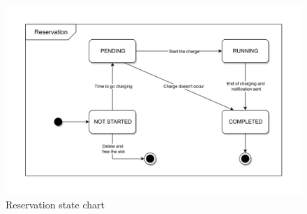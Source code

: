 \begin{figure}[H]
      \centering
      \includegraphics[scale=0.25]{src/state_diagram/transaction.png}
      \caption{Reservation state chart}
\end{figure} \vspace{1cm}

